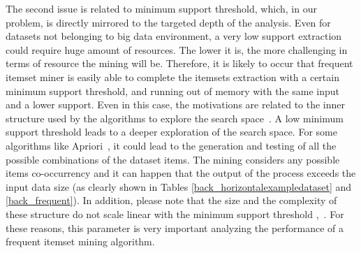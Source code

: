 The second issue is related to minimum support threshold, which, in our problem, is directly mirrored to the targeted depth of the analysis. 
Even for datasets not belonging to big data environment, a very low support 
extraction could require huge amount of resources. 
The lower it is, the more challenging in terms of resource the mining will be. 
Therefore, it is likely to occur that frequent itemset miner is easily able to complete the itemsets extraction with a certain minimum support threshold, and running out of memory with the same input and a lower support. 
Even in this case, the motivations are related to the inner structure used by the algorithms to explore the search space~\cite{goethals2003survey}. A low minimum support threshold leads to a deeper exploration of the search space. For some algorithms like Apriori~\cite{Agr94}, it could lead to the generation and testing of all the possible combinations of the dataset items. The mining considers any possible items co-occurrency and it can happen that the output of the process exceeds the input data size (as clearly shown in Tables \ref{back_horizontalexampledataset} and \ref{back_frequent}). In addition, please note that the size and the complexity of these structure do not scale linear with the minimum support threshold \cite{KumarBook},~\cite{goethals2003survey}. For these reasons, this parameter is very important analyzing the performance of a frequent itemset mining algorithm. 







